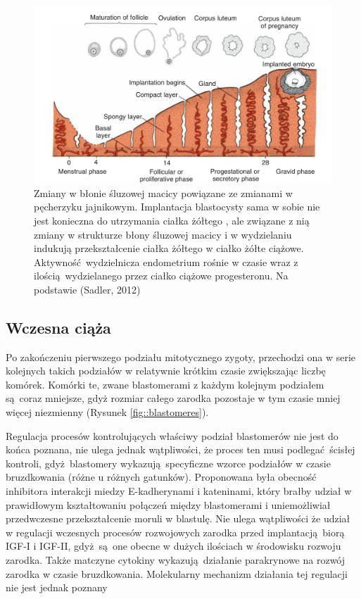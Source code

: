 \documentclass[two column, twoside, a4paper]{article}
\begin{document}
 \begin{figure}[ht!]
	 \begin{tcolorbox}
		 \centering
		 \includegraphics[width=\textwidth]{./figures/endometrium.png}
		 \caption{Zmiany w błonie śluzowej macicy powiązane ze zmianami w pęcherzyku jajnikowym. Implantacja blastocysty sama w sobie nie jest konieczna do utrzymania ciałka żółtego \autocite{Krzymowski2005}, ale związane z nią zmiany w strukturze błony śluzowej macicy i w wydzielaniu indukują przekształcenie ciałka żółtego w ciałko żółte ciążowe. Aktywność wydzielnicza endometrium rośnie w czasie wraz z ilością wydzielanego przez ciałko ciążowe progesteronu. Na podstawie (Sadler, 2012)}\label{fig::endometrium}
	\end{tcolorbox}
\end{figure}

\subsection{Wczesna ciąża}

Po zakończeniu pierwszego podziału mitotycznego zygoty, przechodzi ona w serie kolejnych takich podziałów w relatywnie krótkim czasie zwiększając liczbę komórek. Komórki te, zwane blastomerami z każdym kolejnym podziałem są coraz mniejsze, gdyż rozmiar całego zarodka pozostaje w tym czasie mniej więcej niezmienny (Rysunek \ref{fig::blastomeres}).

Regulacja procesów kontrolujących właściwy podział blastomerów nie jest do końca poznana, nie ulega jednak wątpliwości, że proces ten musi podlegać ścisłej kontroli, gdyż blastomery wykazują specyficzne wzorce podziałów w czasie bruzdkowania (różne u różnych gatunków). Proponowana była obecność inhibitora interakcji miedzy E-kadherynami i kateninami, który brałby udział w prawidłowym kształtowaniu połączeń między blastomerami i uniemożliwiał przedwczesne przekształcenie moruli w blastulę. Nie ulega wątpliwości że udział w regulacji wczesnych procesów rozwojowych zarodka przed implantacją biorą IGF-I i IGF-II, gdyż są one obecne w dużych ilościach w środowisku rozwoju zarodka. Także matczyne cytokiny wykazują działanie parakrynowe na rozwój zarodka w czasie bruzdkowania. Molekularny mechanizm działania tej regulacji nie jest jednak poznany \autocite{Sadler2012, Bielanska2001, Watson2004}
\end{document}
